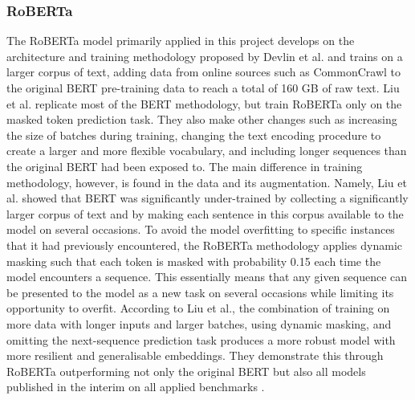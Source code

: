 \documentclass[12pt]{report}
\begin{document}
\subsubsection*{RoBERTa}
The RoBERTa model primarily applied in this project develops on the architecture and training methodology proposed by Devlin et al. \citeyear{BERT} and trains on a larger corpus of text, adding data from online sources such as CommonCrawl to the original BERT pre-training data to reach a total of 160 GB of raw text.
Liu et al. \citeyear{roberta} replicate most of the BERT methodology, but train RoBERTa only on the masked token prediction task.
They also make other changes such as increasing the size of batches during training, changing the text encoding procedure to create a larger and more flexible vocabulary, and including longer sequences than the original BERT had been exposed to.
The main difference in training methodology, however, is found in the data and its augmentation.
Namely, Liu et al. \citeyear{roberta} showed that BERT was significantly under-trained by collecting a significantly larger corpus of text and by making each sentence in this corpus available to the model on several occasions.
To avoid the model overfitting to specific instances that it had previously encountered, the RoBERTa methodology applies dynamic masking such that each token is masked with probability 0.15 each time the model encounters a sequence.
This essentially means that any given sequence can be presented to the model as a new task on several occasions while limiting its opportunity to overfit.
According to Liu et al., the combination of training on more data with longer inputs and larger batches, using dynamic masking, and omitting the next-sequence prediction task produces a more robust model with more resilient and generalisable embeddings.
They demonstrate this through RoBERTa outperforming not only the original BERT but also all models published in the interim on all applied benchmarks \cite{roberta}.
\end{document}
